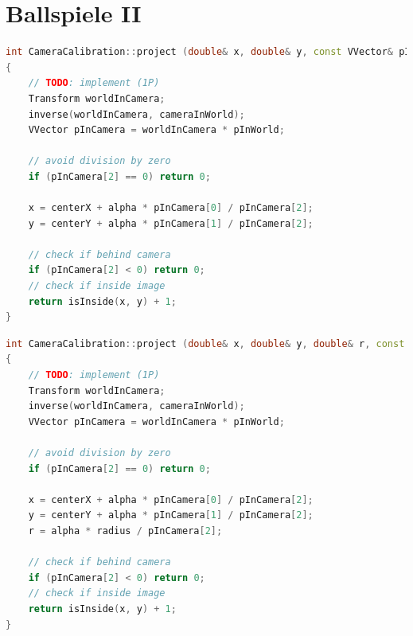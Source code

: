 \documentclass{ezb}
\begin{document}

\section{Ballspiele II}

\begin{lstlisting}[language=C++, caption=Computes the perspective projection (in pixel) of \textbackslash c p]
int CameraCalibration::project (double& x, double& y, const VVector& pInWorld) const
{
	// TODO: implement (1P)
	Transform worldInCamera;
	inverse(worldInCamera, cameraInWorld);
	VVector pInCamera = worldInCamera * pInWorld;

	// avoid division by zero
	if (pInCamera[2] == 0) return 0;

	x = centerX + alpha * pInCamera[0] / pInCamera[2];
	y = centerY + alpha * pInCamera[1] / pInCamera[2];

	// check if behind camera
	if (pInCamera[2] < 0) return 0;
	// check if inside image
	return isInside(x, y) + 1;
}
\end{lstlisting}

\begin{lstlisting}[language=C++, caption=Project a sphere of \textbackslash c radius at \textbackslash c p into the image]
int CameraCalibration::project (double& x, double& y, double& r, const VVector& pInWorld, double radius) const
{
	// TODO: implement (1P)
	Transform worldInCamera;
	inverse(worldInCamera, cameraInWorld);
	VVector pInCamera = worldInCamera * pInWorld;

	// avoid division by zero
	if (pInCamera[2] == 0) return 0;

	x = centerX + alpha * pInCamera[0] / pInCamera[2];
	y = centerY + alpha * pInCamera[1] / pInCamera[2];
	r = alpha * radius / pInCamera[2];

	// check if behind camera
	if (pInCamera[2] < 0) return 0;
	// check if inside image
	return isInside(x, y) + 1;
}
\end{lstlisting}
\end{document}
